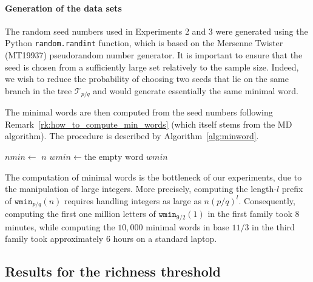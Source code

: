 \documentclass{template_arxiv}
\numberwithin{equation}{section}
\newcommand{\wmin}{\mathtt{wmin}}
\newcommand{\tree}{\mathcal{T}} %
\begin{document}
\paragraph{Generation of the data sets}

The random seed numbers used in Experiments 2 and 3 were generated using the Python \texttt{random.randint} function, which is based on the Mersenne Twister (MT19937) pseudorandom number generator. It is important to ensure that the seed is chosen from a sufficiently large set relatively to the sample size. Indeed, we wish to reduce the probability of choosing two seeds that lie on the same branch in the tree $\tree_{p/q}$ and would generate essentially the same minimal word.


The minimal words are then computed from the  seed numbers following Remark~\ref{rk:how_to_compute_min_words} (which itself stems from the MD algorithm). The procedure is described by Algorithm~\ref{alg:minword}. 

\begin{algorithm}[H]\label{alg:minword}
	\caption{Computation of the first $l$ letters of $\wmin_{p/q}(n)$}
	$nmin \gets$ $n$\;
	$wmin \gets \text{the empty word}$\;
	\Return $wmin$\;
\end{algorithm}

The computation of minimal words is the bottleneck of our experiments, due to the manipulation of large integers. More precisely, computing the length-$l$ prefix of $\wmin_{p/q}(n)$ requires handling integers as large as $n(p/q)^l$. Consequently, computing the first one million letters of $\wmin_{9/2}(1)$ in the first family took $8$ minutes, while computing the $10{,}000$  minimal words in base $11/3$ in the third family took approximately $6$ hours on a standard laptop.







\subsection{Results for the richness threshold}
\end{document}
